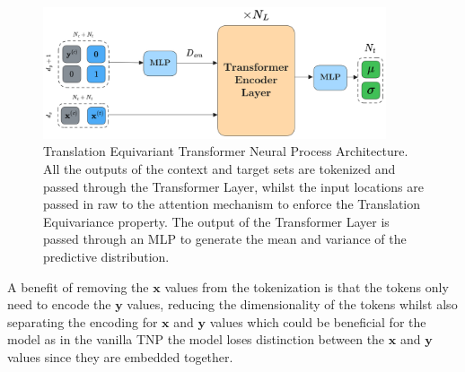 \documentclass[../../main.tex]{subfiles}
\begin{document}
\begin{figure}[H]
	\centering
	\includegraphics[width=0.9\textwidth]{./tetnp.png}
	\caption{Translation Equivariant Transformer Neural Process Architecture. All the outputs of the context and target sets are tokenized and passed through the Transformer Layer, whilst the input locations are passed in raw to the attention mechanism to enforce the Translation Equivariance property. The output of the Transformer Layer is passed through an MLP to generate the mean and variance of the predictive distribution.}
	\label{fig:tetnp}
\end{figure}


A benefit of removing the $\bm{x}$ values from the tokenization is that the tokens only need to encode the $\bm{y}$ values, reducing the dimensionality of the tokens whilst also separating the encoding for $\bm{x}$ and $\bm{y}$ values which could be beneficial for the model as in the vanilla TNP the model loses distinction between the $\bm{x}$ and $\bm{y}$ values since they are embedded together.









\end{document}
